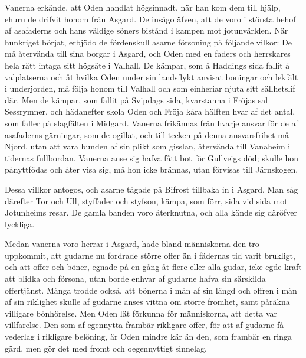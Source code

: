 Vanerna erkände, att Oden handlat högsinnadt, när han kom dem till
hjälp, ehuru de drifvit honom från Asgard. De insågo äfven, att de voro
i största behof af asafaderns och hans väldige söners bistånd i kampen
mot jotunvärlden. När hunkriget börjat, erbjödo de fördenskull asarne
försoning på följande vilkor: De må återvända till sina borgar i Asgard,
och Oden med en faders och herrskares hela rätt intaga sitt högsäte i
Valhall. De kämpar, som å Haddings sida fallit å valplatserna och åt
hvilka Oden under sin landsflykt anvisat boningar och lekfält i
underjorden, må följa honom till Valhall och som einheriar njuta sitt
sällhetslif där. Men de kämpar, som fallit på Svipdags sida, kvarstanna
i Fröjas sal Sessrymner, och hädanefter skola Oden och Fröja kåra
hälften hvar af det antal, som faller på slagfälten i Midgard. Vanerna
frikännas från hvarje ansvar för de af asafaderns gärningar, som de
ogillat, och till tecken på denna ansvarsfrihet må Njord, utan att vara
bunden af sin plikt som gisslan, återvända till Vanaheim i tidernas
fullbordan. Vanerna anse sig hafva fått bot för Gullveigs död; skulle
hon pånyttfödas och åter visa sig, må hon icke brännas, utan förvisas
till Järnskogen.



Dessa villkor antogos, och asarne tågade på Bifrost tillbaka in i
Asgard. Man såg därefter Tor och Ull, styffader och styfson, kämpa, som
förr, sida vid sida mot Jotunheims resar. De gamla banden voro
återknutna, och alla kände sig däröfver lyckliga.

Medan vanerna voro herrar i Asgard, hade bland människorna den tro
uppkommit, att gudarne nu fordrade större offer än i fädernas tid varit
brukligt, och att offer och böner, egnade på en gång åt flere eller alla
gudar, icke egde kraft att blidka och försona, utan borde enhvar af
gudarne hafva sin särskilda offertjänst. Många trodde också, att bönerna
i mån af sin längd och offren i mån af sin riklighet skulle af gudarne
anses vittna om större fromhet, samt påräkna villigare bönhörelse. Men
Oden lät förkunna för människorna, att detta var villfarelse. Den som af
egennytta frambär rikligare offer, för att af gudarne få vederlag i
rikligare belöning, är Oden mindre kär än den, som frambär en ringa
gärd, men gör det med fromt och oegennyttigt sinnelag.

